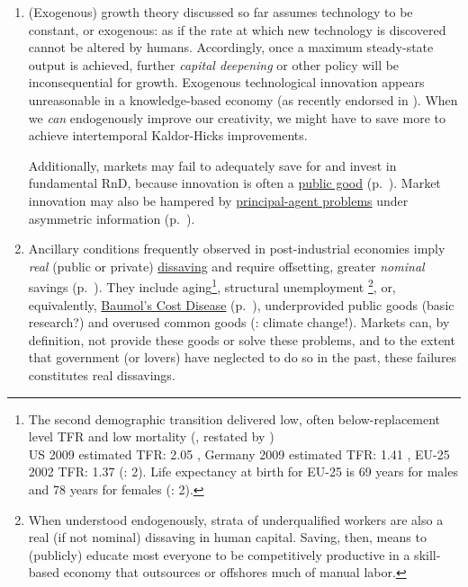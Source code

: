 \begin{enumerate}%
	\item (Exogenous) growth theory discussed so far assumes technology to be constant, or exogenous: as if the rate at which new technology is discovered cannot be altered by humans. Accordingly, once a maximum steady-state output is achieved, further \emph{capital deepening} or other policy will be inconsequential for growth. Exogenous technological innovation appears unreasonable in a knowledge-based economy (as recently endorsed in \citealt{Communities2009}). When we \emph{can} endogenously improve our creativity, we might have to save more to achieve intertemporal Kaldor-Hicks improvements. 

	Additionally, markets may fail to adequately save for and invest in fundamental \gls{RnD}, because innovation is often a \hyperref[sec:public-good]{public good} (p.~\pageref{sec:public-good}). Market innovation may also be hampered by \hyperref[sec:principal-agent-problem]{principal-agent problems} under asymmetric information (p.~\pageref{sec:principal-agent-problem}). 

	\item Ancillary conditions frequently observed in post-industrial economies imply \emph{real} (public or private) \hyperref[sec:deltanetworth]{dissaving} and require offsetting, greater \emph{nominal} savings (p.~\pageref{sec:deltanetworth}). They include aging\footnote{
		The second demographic transition delivered low, often below-replacement level \gls{TFR} and low mortality (\citealt{Davis1945}, restated by \citealt{Caldwell-1976-aa}) \\ US 2009 estimated \gls{TFR}: 2.05 \citep{CIA2009}, Germany 2009 estimated \gls{TFR}: 1.41 \citep{CIA2009}, EU-25 2002 \gls{TFR}: 1.37 (\citealt{Demeny-2003-aa}: 2). Life expectancy at birth for EU-25 is 69 years for males and 78 years for females (\citealt{Demeny-2003-aa}: 2).}, 
	structural unemployment \footnote{
		When understood endogenously, strata of underqualified workers are also a real (if not nominal) dissaving in human capital. Saving, then, means to (publicly) educate most everyone to be competitively productive in a skill-based economy that outsources or offshores much of manual labor.}, 
	or, equivalently, \hyperref[it:non-linearreturns]{Baumol's Cost Disease} (p.~\pageref{it:non-linearreturns}), underprovided public goods (basic research?) and overused common goods (\citealt{Stern-2006-aa}: climate change!). Markets can, by definition, not provide these goods or solve these problems, and to the extent that government (or lovers) have neglected to do so in the past, these failures constitutes real dissavings.


\end{enumerate}
